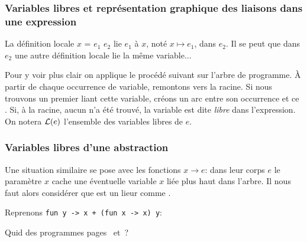 %
\begin{frame}
\frametitle{Variables libres et représentation graphique des liaisons dans une expression}

La définition locale \Xlet{} $x$ = $e_1$ \Xin{} $e_2$ lie $e_1$ à $x$,
noté $x \mapsto e_1$, dans $e_2$. Il se peut que dans $e_2$ une autre
définition locale lie la même variable...

\bigskip

Pour y voir plus clair on applique le procédé suivant sur l'arbre de
programme. À partir de chaque occurrence de variable, remontons vers
la racine. Si nous trouvons un premier \Xlet{} liant cette variable,
créons un arc entre son occurrence et ce \Xlet. Si, à la racine, aucun
\Xlet{} n'a été trouvé, la variable est dite \emph{libre} dans
l'expression. On notera ${\cal L} (e)$ l'ensemble des variables libres
de $e$.  {\small
\begin{center}
\end{center}
}

\end{frame}

%
\begin{frame}[containsverbatim]
\frametitle{Variables libres d'une abstraction}

Une situation similaire se pose avec les fonctions \Xfun{} $x
\rightarrow e$: dans leur corps $e$ le paramètre $x$ cache une
éventuelle variable $x$ liée plus haut dans l'arbre. Il nous faut
alors considérer que \Xfun{} est un lieur comme \Xlet.

\bigskip

Reprenons \verb|fun y -> x + (fun x -> x) y|:
{\small
\begin{center}
\end{center}
}
Quid des programmes pages~\pageref{un_autre_programme}
et~\pageref{exemples_arbres_suite}?

\end{frame}

